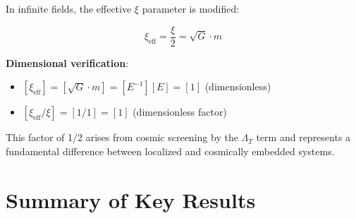 \documentclass[12pt,a4paper]{article}
\begin{document}
	In infinite fields, the effective $\xi$ parameter is modified:
	
	\begin{equation}
		\label{eq:xi_effective}
		\xi_{\text{eff}} = \frac{\xi}{2} = \sqrt{G} \cdot m
	\end{equation}
	
	\textbf{Dimensional verification}:
	\begin{itemize}
		\item $[\xi_{\text{eff}}] = [\sqrt{G} \cdot m] = [E^{-1}][E] = [1]$ (dimensionless) \checkmark
		\item $[\xi_{\text{eff}}/\xi] = [1/1] = [1]$ (dimensionless factor) \checkmark
	\end{itemize}
	
	This factor of 1/2 arises from cosmic screening by the $\Lambda_T$ term and represents a fundamental difference between localized and cosmically embedded systems.
	
	\section{Summary of Key Results}
	\label{sec:key_results}
	
\end{document}

